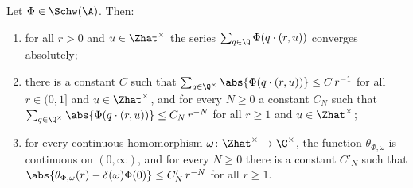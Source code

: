 Let $\Phi\in\Schw(\A)$. Then:
\begin{enumerate}
\item for all $r>0$ and $u\in\Zhat^\times$ the series $\sum_{q\in\Q}\Phi(q\cdot(r,u))$ converges absolutely;
\item there is a constant $C$ such that $\sum_{q\in\Q^\times}\abs{\Phi(q\cdot(r,u))}\le C\,r^{-1}$ for all
  $r\in(0,1]$ and $u\in\Zhat^\times$, and for every $N\ge0$ a constant $C_N$ such that
  $\sum_{q\in\Q^\times}\abs{\Phi(q\cdot(r,u))}\le C_N\,r^{-N}$ for all $r\ge1$ and $u\in\Zhat^\times$;
\item for every continuous homomorphism $\omega\colon\Zhat^\times\to\C^\times$, the function $\theta_{\Phi,\omega}$ is
  continuous on $(0,\infty)$, and for every $N\ge0$ there is a constant $C'_N$ such that
  $\abs{\theta_{\Phi,\omega}(r)-\delta(\omega)\Phi(0)}\le C'_N\,r^{-N}$ for all $r\ge1$.
\end{enumerate}
